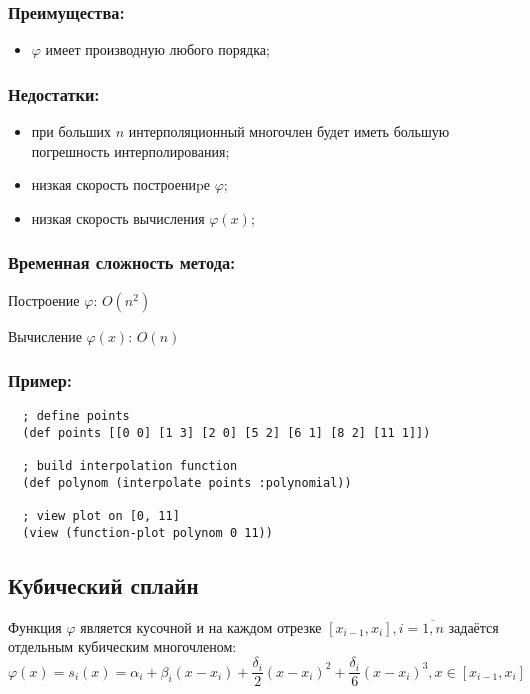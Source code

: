 \subsubsection{Преимущества:}

\begin{itemize}
\item $\varphi$ имеет производную любого порядка;
\end{itemize}

\subsubsection{Недостатки:}

\begin{itemize}
\item при больших $n$ интерполяционный многочлен будет иметь большую погрешность интерполирования;
\item низкая скорость построениpе $\varphi$;
\item низкая скорость вычисления $\varphi(x)$;
\end{itemize}

\subsubsection{Временная сложность метода:}

Построение $\varphi$: $O(n^2)$

Вычисление $\varphi(x)$: $O(n)$

\subsubsection{Пример:}

\begin{verbatim}
  ; define points
  (def points [[0 0] [1 3] [2 0] [5 2] [6 1] [8 2] [11 1]])

  ; build interpolation function
  (def polynom (interpolate points :polynomial))

  ; view plot on [0, 11]
  (view (function-plot polynom 0 11))
\end{verbatim}



\subsection{Кубический сплайн}

Функция $\varphi$ является кусочной и на каждом отрезке $[x_{i-1},x_i], i=\overline{1,n}$ задаётся отдельным кубическим многочленом:
\begin{equation}
  \varphi(x) = s_i(x) = \alpha_i + \beta_i(x - x_i) + \frac{\delta_i}{2}(x - x_i)^2 + \frac{\delta_i}{6}(x - x_i)^3, x \in [x_{i-1}, x_i]
\end{equation}

